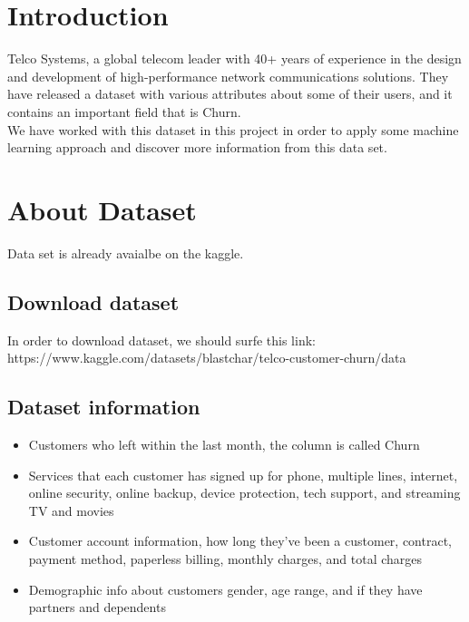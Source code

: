 \documentclass[12pt]{article}
\begin{document}
\tableofcontents

\newpage


\section{Introduction}
Telco Systems, a global telecom leader with 40+ years of experience in the design and development of high-performance network communications solutions.
They have released a dataset with various attributes about some of their users, and it contains an important field that is Churn.\\
We have worked with this dataset in this project in order to apply some machine learning approach and discover more information from this data set.

\section{About Dataset}
Data set is already avaialbe on the kaggle.

\subsection{Download dataset}
In order to download dataset, we should surfe this link:\\
https://www.kaggle.com/datasets/blastchar/telco-customer-churn/data

\subsection{Dataset information}
\begin{itemize}
  \item Customers who left within the last month, the column is called Churn
  \item Services that each customer has signed up for phone, multiple lines, internet, online security, online backup, device protection, tech support, and streaming TV and movies
  \item Customer account information, how long they've been a customer, contract, payment method, paperless billing, monthly charges, and total charges
  \item Demographic info about customers gender, age range, and if they have partners and dependents
\end{itemize}

\newpage
\end{document}
